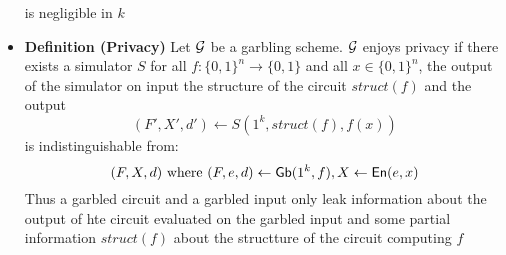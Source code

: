 \begin{itemize}
\begin{equation*}
    \end{equation*}
    is negligible in $k$
    \item \textbf{Definition (Privacy)} Let $\mathcal G$ be a garbling scheme. $\mathcal G$ enjoys privacy if there exists a simulator $S$ for all $f: \{0,1\}^n \to \{0,1\}$ and all $x \in \{0, 1\}^n$, the output of the simulator on input the structure of the circuit $struct(f)$ and the output
    \begin{equation*}
        (F', X', d') \leftarrow S(1^k, struct(f), f(x))
    \end{equation*}
    is indistinguishable from:
    \begin{equation*}
        (F,X,d) \text{ where } (F, e, d) \leftarrow \mathsf{Gb}(1^k, f), X \leftarrow \mathsf{En}(e,x)
    \end{equation*}
    Thus a garbled circuit and a garbled input only leak information about the output of hte circuit evaluated on the garbled input and some partial information $struct(f)$ about the structture of the circuit computing $f$
\end{itemize}

